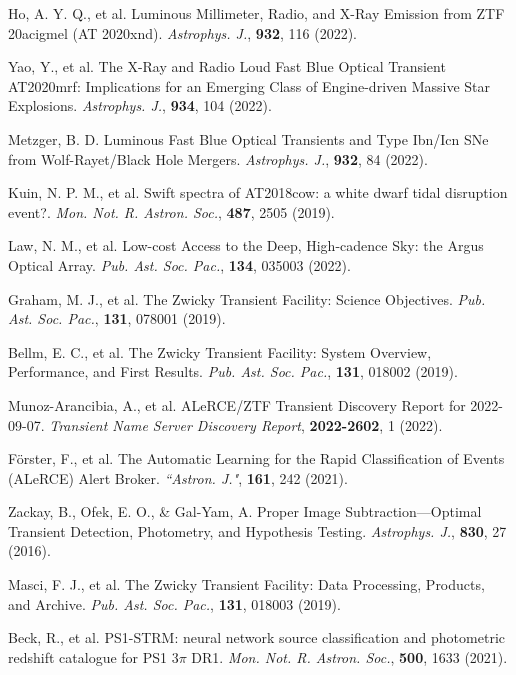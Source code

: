 \documentclass{nature_plusfigure}
\newcommand{\mn}{{Mon. Not. R. Astron. Soc.}}
\newcommand{\mnras}{\mn}
\newcommand{\aj}{{``Astron. J."}}
\newcommand{\apj}{{Astrophys. J.}}
\newcommand{\pasp}{{Pub. Ast. Soc. Pac.}}
\begin{document}
\begin{thebibliography}{100}
 Ho, A. Y. Q., et al. Luminous Millimeter, Radio, and X-Ray Emission from ZTF 20acigmel (AT 2020xnd). \emph{\apj}, \textbf{932}, 116 (2022). 

 Yao, Y., et al. The X-Ray and Radio Loud Fast Blue Optical Transient AT2020mrf: Implications for an Emerging Class of Engine-driven Massive Star Explosions. \emph{\apj}, \textbf{934}, 104 (2022). 


  Metzger, B. D. Luminous Fast Blue Optical Transients and Type Ibn/Icn SNe from Wolf-Rayet/Black Hole Mergers. \emph{\apj}, \textbf{932}, 84 (2022). 

  Kuin, N. P. M., et al. Swift spectra of AT2018cow: a white dwarf tidal disruption event?. \emph{\mnras}, \textbf{487}, 2505 (2019). 


 Law, N. M., et al. Low-cost Access to the Deep, High-cadence Sky: the Argus Optical Array. \emph{\pasp}, \textbf{134}, 035003 (2022). 

 Graham, M. J., et al. The Zwicky Transient Facility: Science Objectives. \emph{\pasp}, \textbf{131}, 078001 (2019). 

 Bellm, E. C., et al. The Zwicky Transient Facility: System Overview, Performance, and First Results. \emph{\pasp}, \textbf{131}, 018002 (2019). 


 Munoz-Arancibia, A., et al. ALeRCE/ZTF Transient Discovery Report for 2022-09-07. \emph{Transient Name Server Discovery Report}, \textbf{2022-2602}, 1 (2022). 

 Förster, F., et al. The Automatic Learning for the Rapid Classification of Events (ALeRCE) Alert Broker. \emph{\aj}, \textbf{161}, 242 (2021). 

 Zackay, B., Ofek, E. O., \& Gal-Yam, A. Proper Image Subtraction—Optimal Transient Detection, Photometry, and Hypothesis Testing. \emph{\apj}, \textbf{830}, 27 (2016). 

 Masci, F. J., et al. The Zwicky Transient Facility: Data Processing, Products, and Archive. \emph{\pasp}, \textbf{131}, 018003 (2019). 

 Beck, R., et al. PS1-STRM: neural network source classification and photometric redshift catalogue for PS1 3$\pi$ DR1. \emph{\mnras}, \textbf{500}, 1633 (2021). 


\end{thebibliography}
\end{document}
